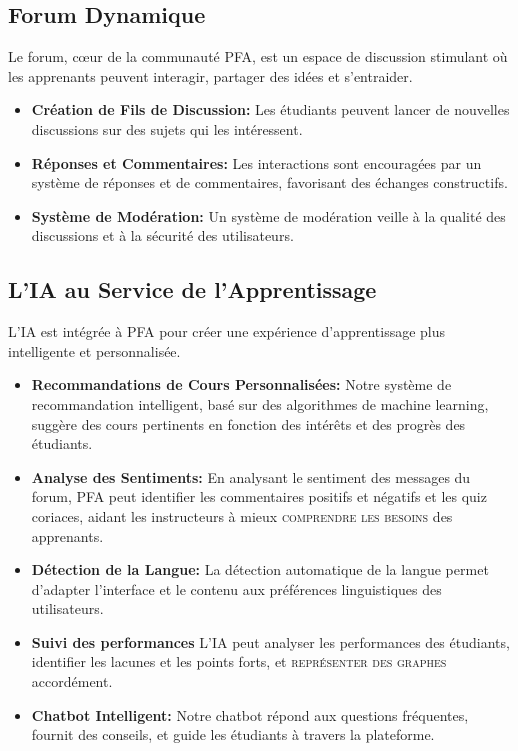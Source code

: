 \subsection{Forum Dynamique}

Le forum, cœur de la communauté PFA, est un espace de discussion stimulant où les apprenants peuvent interagir, partager des idées et s'entraider.

\begin{itemize}
    \item \textbf{Création de Fils de Discussion:} Les étudiants peuvent lancer de nouvelles discussions sur des sujets qui les intéressent.
    \item \textbf{Réponses et Commentaires:} Les interactions sont encouragées par un système de réponses et de commentaires, favorisant des échanges constructifs.
    \item \textbf{Système de Modération:} Un système de modération veille à la qualité des discussions et à la sécurité des utilisateurs.
\end{itemize}

\subsection{L'IA au Service de l'Apprentissage}

L'IA est intégrée à PFA pour créer une expérience d'apprentissage plus intelligente et personnalisée.

\begin{itemize}
    \item \textbf{Recommandations de Cours Personnalisées:} Notre système de recommandation intelligent, basé sur des algorithmes de machine learning, suggère des cours pertinents en fonction des intérêts et des progrès des étudiants.
    \item \textbf{Analyse des Sentiments:} En analysant le sentiment des messages du forum, PFA peut identifier les commentaires positifs et négatifs et les quiz coriaces, aidant les instructeurs à mieux \textsc{comprendre les besoins} des apprenants.
    \item \textbf{Détection de la Langue:} La détection automatique de la langue permet d'adapter l'interface et le contenu aux préférences linguistiques des utilisateurs.
    \item \textbf{Suivi des performances} L'IA peut analyser les performances des étudiants, identifier les lacunes et les points forts, et \textsc{représenter des graphes} accordément.
    \item \textbf{Chatbot Intelligent:} Notre chatbot répond aux questions fréquentes, fournit des conseils, et guide les étudiants à travers la plateforme.
\end{itemize}

